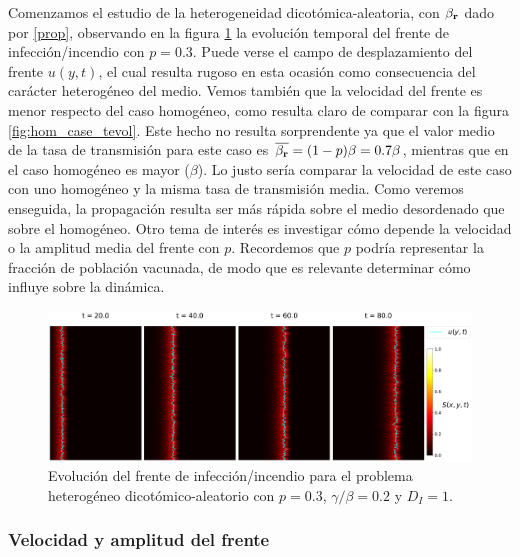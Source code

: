 Comenzamos el estudio de la heterogeneidad dicotómica-aleatoria, con $\beta_{\vb r}$ dado por \ref{prop}, observando en la figura \ref{fig:hom_case_tevol_hetero} la
evolución temporal del frente de infección/incendio con $p=0.3$. Puede verse el campo de desplazamiento del frente $u(y,t)$,
el cual resulta rugoso en esta ocasión como consecuencia del carácter heterogéneo del medio. Vemos también que la velocidad del frente es menor respecto del caso 
homogéneo, como resulta claro de comparar con la figura \ref{fig:hom_case_tevol}. Este hecho no resulta sorprendente ya que el valor medio de la tasa 
de transmisión para este caso es $\overline{\beta_{\vb r}}=(1-p)\beta=0.7\beta$, mientras que en el caso homogéneo es mayor ($\beta$). Lo justo 
sería comparar la velocidad de este caso con uno homogéneo y la misma tasa de transmisión media. Como veremos enseguida, la propagación resulta ser más rápida sobre el 
medio desordenado que sobre el homogéneo. Otro tema de interés es investigar cómo depende la velocidad o la amplitud media del frente con $p$. Recordemos que $p$ podría 
representar la fracción de población vacunada, de modo que es relevante determinar cómo influye sobre la dinámica.  
\begin{figure}[h]
    \centering
    \includegraphics[width=\imsizeL]{hetal_case_tevol.pdf}
    \caption{Evolución del frente de infección/incendio para el problema heterogéneo dicotómico-aleatorio con $p=0.3$, $\gamma/\beta=0.2$ y $D_{I}=1$.}
    \label{fig:hom_case_tevol_hetero}
\end{figure}

\subsubsection*{Velocidad y amplitud del frente}

